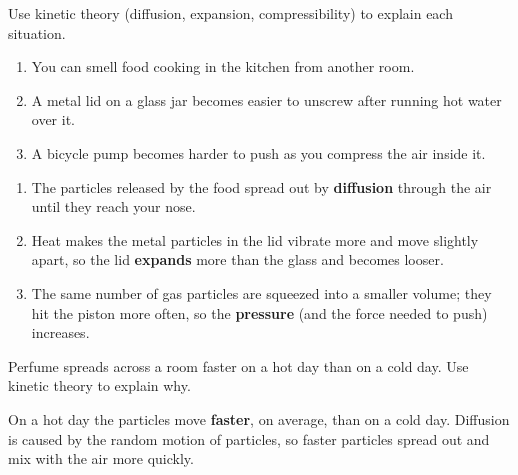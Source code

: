 \begin{exercise}
    Use kinetic theory (diffusion, expansion, compressibility) to explain each situation.
    \begin{enumerate}[label=\letraminuscula]
        \item You can smell food cooking in the kitchen from another room.
        \item A metal lid on a glass jar becomes easier to unscrew after running hot water over it.
        \item A bicycle pump becomes harder to push as you compress the air inside it.
    \end{enumerate}
    \begin{solu}
        \begin{enumerate}[label=\alph*)]
            \item The particles released by the food spread out by \textbf{diffusion} through the air until they reach your nose.
            \item Heat makes the metal particles in the lid vibrate more and move slightly apart, so the lid \textbf{expands} more than the glass and becomes looser.
            \item The same number of gas particles are squeezed into a smaller volume; they hit the piston more often, so the \textbf{pressure} (and the force needed to push) increases.
        \end{enumerate}
    \end{solu}
\end{exercise}

\begin{exercise}
    Perfume spreads across a room faster on a hot day than on a cold day. Use kinetic theory to explain why.
    \begin{solu}
        On a hot day the particles move \textbf{faster}, on average, than on a cold day. Diffusion is caused by the random motion of particles, so faster particles spread out and mix with the air more quickly.
    \end{solu}
\end{exercise}

